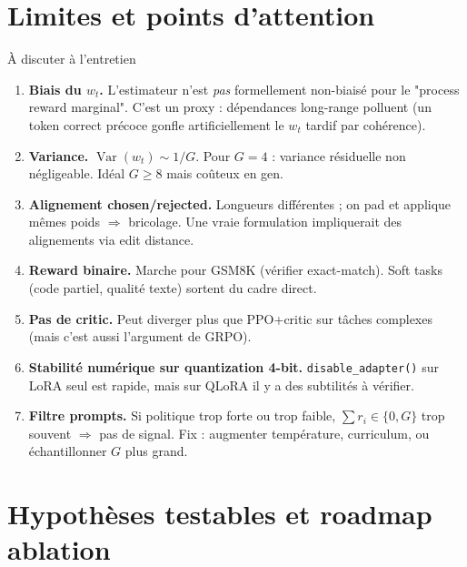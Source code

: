 \documentclass[10pt,a4paper]{article}
\DeclareMathOperator{\Var}{Var}
\begin{document}
\section{Limites et points d'attention}

\begin{caveat}{À discuter à l'entretien}
\begin{enumerate}[leftmargin=*]
  \item \textbf{Biais du $w_t$.} L'estimateur n'est \emph{pas} formellement non-biaisé pour le "process reward marginal". C'est un proxy : dépendances long-range polluent (un token correct précoce gonfle artificiellement le $w_t$ tardif par cohérence).
  \item \textbf{Variance.} $\Var(w_t) \sim 1/G$. Pour $G=4$ : variance résiduelle non négligeable. Idéal $G \ge 8$ mais coûteux en gen.
  \item \textbf{Alignement chosen/rejected.} Longueurs différentes ; on pad et applique mêmes poids $\Rightarrow$ bricolage. Une vraie formulation impliquerait des alignements via edit distance.
  \item \textbf{Reward binaire.} Marche pour GSM8K (vérifier exact-match). Soft tasks (code partiel, qualité texte) sortent du cadre direct.
  \item \textbf{Pas de critic.} Peut diverger plus que PPO+critic sur tâches complexes (mais c'est aussi l'argument de GRPO).
  \item \textbf{Stabilité numérique sur quantization 4-bit.} \texttt{disable\_adapter()} sur LoRA seul est rapide, mais sur QLoRA il y a des subtilités à vérifier.
  \item \textbf{Filtre prompts.} Si politique trop forte ou trop faible, $\sum r_i \in \{0, G\}$ trop souvent $\Rightarrow$ pas de signal. Fix : augmenter température, curriculum, ou échantillonner $G$ plus grand.
\end{enumerate}
\end{caveat}

\section{Hypothèses testables et roadmap ablation}
\end{document}
